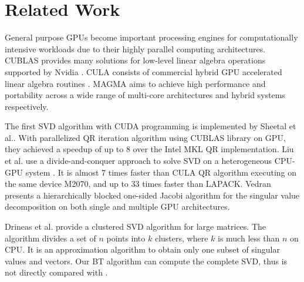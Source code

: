 \vspace{-0.1in}
\section{Related Work} \label{sec:related}
\vspace{-0.1in}
General purpose GPUs become important processing engines for computationally intensive workloads due to their highly parallel computing architectures.
CUBLAS provides many solutions for low-level linear algebra operations supported by Nvidia \cite{cublas}. 
CULA consists of commercial hybrid GPU accelerated linear algebra routines \cite{cula}.
MAGMA aims to achieve high performance and portability across a wide range of multi-core architectures and hybrid systems respectively\cite{magma}.


The first SVD algorithm with CUDA programming is implemented by Sheetal et al.\cite{09IPDPSQR}. With parallelized QR iteration algorithm using CUBLAS library on GPU, they achieved a speedup of up to 8 over the Intel MKL QR implementation.
Liu et al. use a divide-and-conquer approach to solve SVD on a heterogeneous CPU-GPU system \cite{13CFDC}.
It is almost 7 times faster than CULA QR algorithm executing on the same device M2070, and up to 33 times faster than LAPACK.
Vedran\cite{14arxivjacobi} presents a hierarchically blocked one-sided Jacobi algorithm for the singular value decomposition on both single and multiple GPU architectures. 

Drineas et al. \cite{99clustering} provide a clustered SVD algorithm for large matrices. The algorithm divides a set of $n$ points into $k$ clusters, where $k$ is much less than $n$ on CPU.
It is an approximation algorithm to obtain only one subset of singular values
and vectors. Our BT algorithm can compute the complete SVD, thus is not
directly compared with \cite{99clustering}. 

